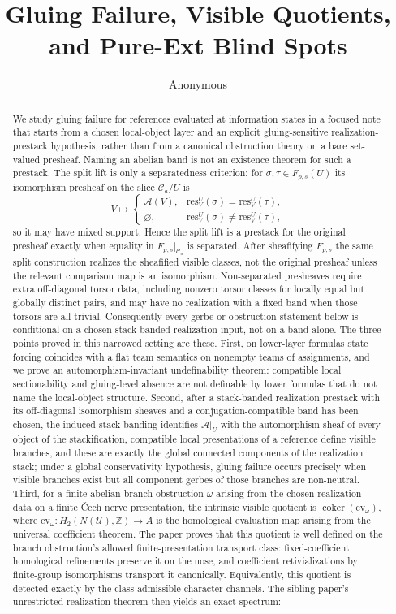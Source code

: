 \documentclass[reqno]{amsart}
\title[Gluing Failure, Visible Quotients, and Pure-Ext Blind Spots]{Gluing Failure, Visible Quotients, and Pure-Ext Blind Spots}
\author{Anonymous}
\theoremstyle{definition}
\theoremstyle{remark}
\newcommand{\res}{\mathrm{res}}
\newcommand{\Band}{\mathcal{A}}
\begin{document}
\begin{abstract}
We study gluing failure for references evaluated at information states in a focused note that starts from a chosen local-object layer and an explicit gluing-sensitive realization-prestack hypothesis, rather than from a canonical obstruction theory on a bare set-valued presheaf. Naming an abelian band is not an existence theorem for such a prestack. The split lift is only a separatedness criterion: for $\sigma,\tau\in F_{p,s}(U)$ its isomorphism presheaf on the slice $\mathcal C_a/U$ is
\[
V\longmapsto
\begin{cases}
\Band(V), & \res_V^U(\sigma)=\res_V^U(\tau),\\
\varnothing, & \res_V^U(\sigma)\neq\res_V^U(\tau),
\end{cases}
\]
so it may have mixed support. Hence the split lift is a prestack for the original presheaf exactly when equality in $F_{p,s}|_{\mathcal C_a}$ is separated. After sheafifying $F_{p,s}$ the same split construction realizes the sheafified visible classes, not the original presheaf unless the relevant comparison map is an isomorphism. Non-separated presheaves require extra off-diagonal torsor data, including nonzero torsor classes for locally equal but globally distinct pairs, and may have no realization with a fixed band when those torsors are all trivial. Consequently every gerbe or obstruction statement below is conditional on a chosen stack-banded realization input, not on a band alone. The three points proved in this narrowed setting are these. First, on lower-layer formulas state forcing coincides with a flat team semantics on nonempty teams of assignments, and we prove an automorphism-invariant undefinability theorem: compatible local sectionability and gluing-level absence are not definable by lower formulas that do not name the local-object structure. Second, after a stack-banded realization prestack with its off-diagonal isomorphism sheaves and a conjugation-compatible band has been chosen, the induced stack banding identifies $\Band|_U$ with the automorphism sheaf of every object of the stackification, compatible local presentations of a reference define visible branches, and these are exactly the global connected components of the realization stack; under a global conservativity hypothesis, gluing failure occurs precisely when visible branches exist but all component gerbes of those branches are non-neutral. Third, for a finite abelian branch obstruction $\omega$ arising from the chosen realization data on a finite \v{C}ech nerve presentation, the intrinsic visible quotient is $\operatorname{coker}(\mathrm{ev}_{\omega})$, where $\mathrm{ev}_{\omega}:H_2(N(\mathcal U),\mathbb Z)\to A$ is the homological evaluation map arising from the universal coefficient theorem. The paper proves that this quotient is well defined on the branch obstruction's allowed finite-presentation transport class: fixed-coefficient homological refinements preserve it on the nose, and coefficient retivializations by finite-group isomorphisms transport it canonically. Equivalently, this quotient is detected exactly by the class-admissible character channels. The sibling paper's unrestricted realization theorem then yields an exact spectrum: 
\end{abstract}
\end{document}
